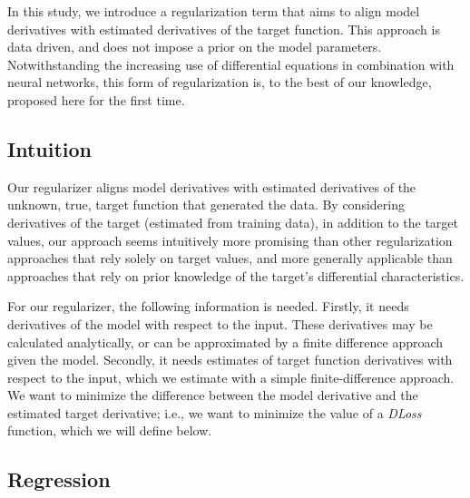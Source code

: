 \documentclass[conference]{IEEEtran}
\begin{document}
In this study, we introduce a regularization term that aims to align model derivatives with estimated derivatives of the target function.
This approach is data driven, and does not impose a prior on the model parameters. 
Notwithstanding the increasing use of differential equations in combination with neural networks, this form of regularization is, to the best of our knowledge, proposed here for the first time.

\subsection{Intuition}
Our regularizer aligns model derivatives with estimated derivatives of the unknown, true, target function that generated the data.
By considering derivatives of the target (estimated from training data), in addition to the target values, our approach seems intuitively more promising than other regularization approaches that rely solely on target values, and more generally applicable than approaches that rely on prior knowledge of the target's differential characteristics.

For our regularizer, the following information is needed.
Firstly, it needs derivatives of the model with respect to the input.
These derivatives may be calculated analytically, or can be approximated by a finite difference approach given the model.
Secondly, it needs estimates of target function derivatives with respect to the input, which we estimate with a simple finite-difference approach. 
We want to minimize the difference between the model derivative and the estimated target derivative; i.e., we want to minimize the value of a \emph{DLoss} function, which we will define below.


\subsection{Regression}
\label{subsec_regressiontasks}
\end{document}
